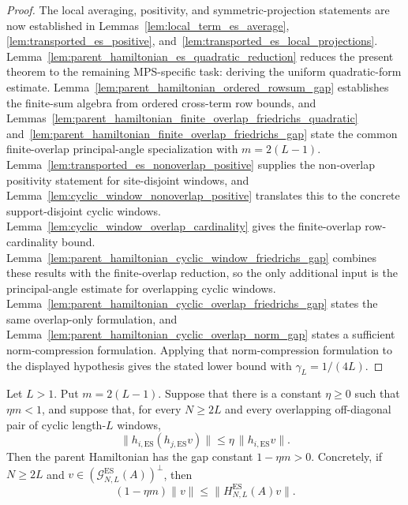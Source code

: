 \begin{proof}
    \leanok
    The local averaging, positivity, and symmetric-projection statements are now
    established in Lemmas~\ref{lem:local_term_es_average},
    \ref{lem:transported_es_positive}, and~\ref{lem:transported_es_local_projections}.
    Lemma~\ref{lem:parent_hamiltonian_es_quadratic_reduction} reduces the present
    theorem to the remaining MPS-specific task: deriving the uniform
    quadratic-form estimate. Lemma~\ref{lem:parent_hamiltonian_ordered_rowsum_gap}
    establishes the finite-sum algebra from ordered cross-term row bounds, and
    Lemmas~\ref{lem:parent_hamiltonian_finite_overlap_friedrichs_quadratic}
    and~\ref{lem:parent_hamiltonian_finite_overlap_friedrichs_gap} state the
    common finite-overlap principal-angle specialization with $m=2(L-1)$.
    Lemma~\ref{lem:transported_es_nonoverlap_positive} supplies the non-overlap
    positivity statement for site-disjoint windows, and
    Lemma~\ref{lem:cyclic_window_nonoverlap_positive} translates this to the
    concrete support-disjoint cyclic windows.
    Lemma~\ref{lem:cyclic_window_overlap_cardinality} gives the finite-overlap
    row-cardinality bound.
    Lemma~\ref{lem:parent_hamiltonian_cyclic_window_friedrichs_gap} combines
    these results with the finite-overlap reduction, so the only additional
    input is the principal-angle estimate for overlapping cyclic windows.
    Lemma~\ref{lem:parent_hamiltonian_cyclic_overlap_friedrichs_gap} states the
    same overlap-only formulation, and
    Lemma~\ref{lem:parent_hamiltonian_cyclic_overlap_norm_gap} states a sufficient
    norm-compression formulation. Applying that norm-compression formulation to
    the displayed hypothesis gives the stated lower bound with
    $\gamma_L=1/(4L)$.
\end{proof}

\begin{theorem}
    \label{thm:friedrichs_gap_bound_constant}
    \leanok
    Let $L>1$. Put $m=2(L-1)$. Suppose that there is a constant $\eta\ge0$
    such that $\eta m<1$, and suppose that, for every
    $N\ge2L$ and every overlapping off-diagonal pair of cyclic length-$L$
    windows,
    \[
        \|h_{i,\mathrm{ES}}(h_{j,\mathrm{ES}}v)\|
        \le
        \eta\,\|h_{i,\mathrm{ES}}v\|.
    \]
    Then the parent Hamiltonian has the gap constant $1-\eta m>0$. Concretely,
    if $N\ge2L$ and $v\in(\mathcal G_{N,L}^{\mathrm{ES}}(A))^\perp$, then
    \[
        (1-\eta m)\|v\|\le \|H_{N,L}^{\mathrm{ES}}(A)v\|.
    \]
\end{theorem}

